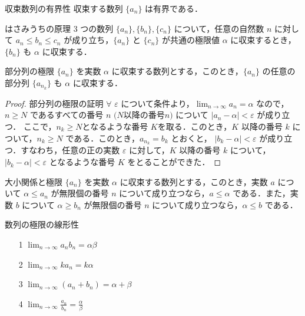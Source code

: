\documentclass[xelatex,ja=standard,jafont=noto]{bxjsarticle}
\begin{document}
  \begin{theorem}{収束数列の有界性}{}
   収束する数列 $\{a_n\}$ は有界である．
  \end{theorem}

  \begin{theorem}{はさみうちの原理}{}
   3 つの数列 $\{a_n\}, \{b_n\}, \{c_n\}$ について，任意の自然数 $n$ に対して $a_n \leq b_n \leq c_n$ が成り立ち，$\{a_n\}$ と $\{c_n\}$ が共通の極限値 $\alpha$ に収束するとき，$\{b_n\}$ も $\alpha$ に収束する．
  \end{theorem}

  \begin{theorem}{部分列の極限}{}
   $\{a_n\}$ を実数 $\alpha$ に収束する数列とする，このとき，$\{a_n\}$ の任意の部分列 $\{a_{n_k}\}$ も $\alpha$ に収束する．
  \end{theorem}

  \begin{proof}{部分列の極限の証明}{}
   $\forall$ $\varepsilon$ について条件より，$\lim_{n \to \infty} a_n = \alpha$ なので，$n \geq N$ であるすべての番号 $n$ $(N $以降の番号$ n)$ について $|a_n - \alpha| < \varepsilon$ が成り立つ．
   ここで，$n_k \geq N $となるような番号 $K $を取る．このとき，$K$ 以降の番号 $k$ について，$n_k \geq N$ である．このとき，$a_{n_k} = b_k$ とおくと，
   $|b_k - \alpha| < \varepsilon$ が成り立つ．すなわち，任意の正の実数 $\varepsilon$ に対して，$K$ 以降の番号 $k$ について，$|b_k - \alpha| < \varepsilon$ となるような番号 $K$ をとることができた．
  \end{proof}

  \begin{theorem}{大小関係と極限}{}
   $\{a_n\}$ を実数 $\alpha$ に収束する数列とする，このとき，実数 $a$ について $\alpha \leq a_n$ が無限個の番号 $n$ について成り立つなら，$a \leq \alpha$ である．また，実数 $b$ について $\alpha \geq b_n$ が無限個の番号 $n$ について成り立つなら，$\alpha \leq b$ である．
  \end{theorem}

\pagebreak
  \begin{theorem}{数列の極限の線形性}{}
   \begin{itemize}
    \item[1 ] $\lim_{n \to \infty} a_n b_n = \alpha \beta$
    \item[2 ] $\lim_{n \to \infty} k a_n = k\alpha$
    \item[3 ] $\lim_{n \to \infty} (a_n + b_n) = \alpha + \beta$
    \item[4 ] $\lim_{n \to \infty} \frac{a_n}{b_n} = \frac{\alpha}{\beta}$
   \end{itemize}
  \end{theorem}
\end{document}
